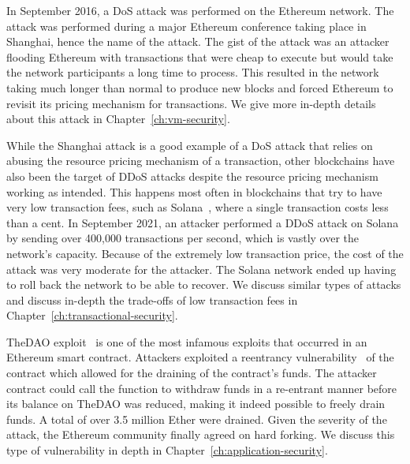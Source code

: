 In September 2016, a DoS attack was performed on the Ethereum network.
The attack was performed during a major Ethereum conference taking place in Shanghai, hence the name of the attack.
The gist of the attack was an attacker flooding Ethereum with transactions that were cheap to execute but would take the network participants a long time to process.
This resulted in the network taking much longer than normal to produce new blocks and forced Ethereum to revisit its pricing mechanism for transactions.
We give more in-depth details about this attack in Chapter~\ref{ch:vm-security}.

While the Shanghai attack is a good example of a DoS attack that relies on abusing the resource pricing mechanism of a transaction, other blockchains have also been the target of DDoS attacks despite the resource pricing mechanism working as intended.
This happens most often in blockchains that try to have very low transaction fees, such as Solana~\cite{solana}, where a single transaction costs less than a cent.
In September 2021, an attacker performed a DDoS attack on Solana by sending over 400,000 transactions per second, which is vastly over the network's capacity.
Because of the extremely low transaction price, the cost of the attack was very moderate for the attacker.
The Solana network ended up having to roll back the network to be able to recover.
We discuss similar types of attacks and discuss in-depth the trade-offs of low transaction fees in Chapter~\ref{ch:transactional-security}.

TheDAO exploit~\cite{Securities2017} is one of the most infamous exploits that occurred in an Ethereum smart contract.
Attackers exploited a reentrancy vulnerability~\cite{Atzei2017} of the contract which allowed for the draining of the contract's funds.
The attacker contract could call the function to withdraw funds in a re-entrant manner before its balance on TheDAO was reduced, making it indeed possible to freely drain funds.
A total of over 3.5 million Ether were drained.
Given the severity of the attack, the Ethereum community finally agreed on hard forking.
We discuss this type of vulnerability in depth in Chapter~\ref{ch:application-security}.

